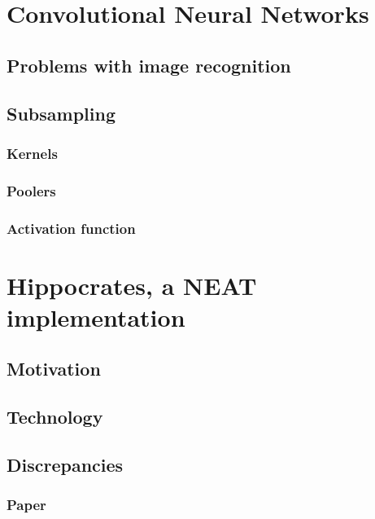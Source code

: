 \documentclass[11pt]{article}
\begin{document}
	\section{Convolutional Neural Networks}
		\subsection{Problems with image recognition}
			
		\subsection{Subsampling}
			
			\subsubsection{Kernels}
			
			\subsubsection{Poolers}
			
			\subsubsection{Activation function}
			
	\newpage

	\section{Hippocrates, a NEAT implementation}
		\subsection{Motivation}
			
		\subsection{Technology}
			
		\subsection{Discrepancies}
			\subsubsection{Paper}
				
\end{document}
